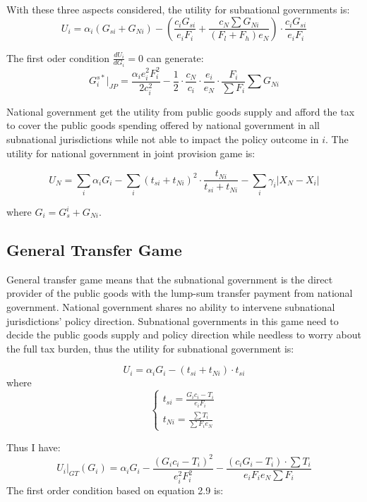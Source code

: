\begin{itemize}
With these three aspects considered, the utility for subnational governments is:
$$U_i=\alpha_i (G_{si}+G_{Ni})-\left(\frac{c_i G_{si}}{e_i F_i}+ \frac{c_N \sum G_{Ni}}{(F_l+F_h) e_N}\right) \cdot \frac{c_i G_{si}}{e_i F_i} $$

The first oder condition $\frac{dU_i}{dG_i}=0$ can generate:
\begin{equation}
  G_{i}^{s*}|_{JP}=\frac{\alpha_ie_i^2F_i^2}{2c_i^2}-\frac{1}{2}\cdot\frac{c_N}{c_i}\cdot\frac{e_i}{e_N}\cdot\frac{F_i}{\sum F_i}\sum G_{Ni}
\end{equation}

National government get the utility from public goods supply and afford the tax to cover the public goods spending offered by national government in all subnational jurisdictions while not able to impact the policy outcome in $i$. The utility for national government in joint provision game is:

\begin{equation}
  U_N= \sum_i \alpha_i G_i - \sum_i (t_{si}+t_{Ni})^2 \cdot \frac{t_{Ni}}{t_{si}+t_{Ni}}
  -\sum_i \gamma_i |X_N-X_i|
\end{equation}

where $G_i=G_{s}^i+G_{Ni}$.

\subsection{General Transfer Game}
General transfer game means that the subnational government is the direct provider of the public goods with the lump-sum transfer payment from national government. National government shares no ability to intervene subnational jurisdictions' policy direction. Subnational governments in this game need to decide the public goods supply and policy direction while needless to worry about the full tax burden, thus the utility for subnational government is:

$$U_i=\alpha_i G_i -(t_{si}+t_{Ni})\cdot t_{si}$$
where
$$
  \left\{\begin{array}{l}
    t_{si}= \frac{G_i c_i-T_i}{e_i F_i} \\
    t_{Ni}=\frac{\sum T_i}{\sum F_i e_N}
  \end{array}\right.
$$

Thus I have:
\begin{equation}
  U_i|_{GT}(G_i)=\alpha_i G_i- \frac{(G_i c_i-T_i)^2}{e_i^2 F_i^2}-\frac{(c_iG_i-T_i)\cdot \sum T_i}{e_i F_i e_N\sum F_i }
\end{equation}
The first order condition based on equation 2.9 is:


\end{itemize}
